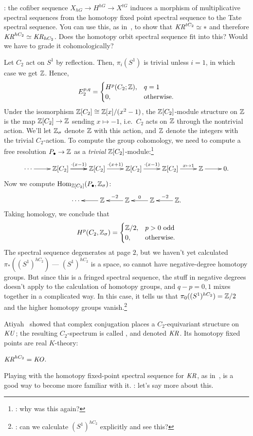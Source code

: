 \TODO: the cofiber sequence $X_{hG}\to H^{hG}\to X^{tG}$ induces a morphism of multiplicative spectral sequences
from the homotopy fixed point spectral sequence to the Tate spectral sequence. You can use this, as
in~\cite[Prop.~11]{HS14}, to show that $\mathit{KR}^{tC_2}\simeq *$ and therefore $\mathit{KR}^{hC_2}\simeq\mathit{KR}_{hC_2}$. Does the
homotopy orbit spectral sequence fit into this? Would we have to grade it cohomologically?
\begin{exm}
\label{reflection}
Let $C_2$ act on $S^1$ by reflection. Then, $\pi_i(S^1)$ is trivial unless $i = 1$, in which case we get $\mathbb Z$.
Hence,
\[E_2^{p,q} = \begin{cases}
	H^p(C_2;\mathbb Z), &q = 1\\
	0, &\text{otherwise}.
\end{cases}\]
Under the isomorphism $\mathbb Z[C_2]\cong \mathbb Z[x]/(x^2-1)$, the $\mathbb Z[C_2]$-module structure on $\mathbb Z$ is the map
$\mathbb Z[C_2]\to\mathbb Z$ sending $x\mapsto -1$, i.e.\ $C_2$ acts on $\mathbb Z$ through the nontrivial action. We'll let $\mathbb Z_\sigma$
denote $\mathbb Z$ with this action, and $\mathbb Z$ denote the integers with the trivial $C_2$-action. To compute the group
cohomology, we need to compute a free resolution $P_\bullet\to\mathbb Z$ as a \emph{trivial}
$\mathbb Z[C_2]$-module:\footnote{\TODO: why was this again?}
\[\xymatrix{
	\dotsb\ar[r] & \Z[C_2]\ar[r]^{\cdot(x-1)}\ar[r] & \Z[C_2]\ar[r]^{\cdot(x+1)} & \Z[C_2]\ar[r]^{\cdot(x-1)} &
	\Z[C_2]\ar[r]^-{x\mapsto 1} & \Z\ar[r] & 0.
}\]
Now we compute $\operatorname{Hom}_{\mathbb Z[C_2]}(P_\bullet, \mathbb Z_\sigma)$:
\[\xymatrix{
	\dotsb & \Z\ar[l] & \Z\ar[l]_{-2} & \Z\ar[l]_0 & \Z.\ar[l]_{-2}
}\]
Taking homology, we conclude that
\[H^p(C_2, \mathbb Z_\sigma) = \begin{cases}
	\mathbb Z/2, &p > 0\text{ odd}\\
	0, &\text{otherwise.}
\end{cases}\]
The spectral sequence degenerates at page $2$, but we haven't yet calculated $\pi_*((S^1)^{hC_2})$ ---
$(S^1)^{hC_2}$ is a space, so cannot have negative-degree homotopy groups. But since this is a fringed spectral
sequence, the stuff in negative degrees doesn't apply to the calculation of homotopy groups, and $q - p = 0,1$
mixes together in a complicated way. In this case, it tells us that $\pi_0((S^1)^{hC_2}) = \mathbb Z/2$ and the higher
homotopy groups vanish.\footnote{\TODO: can we calculate $(S^1)^{hC_2}$ explicitly and see this?}
\end{exm}
\begin{exm}
Atiyah~\cite{AtiyahKR} showed that complex conjugation places a $C_2$-equivariant structure on $\mathit{KU}$; the resulting
$C_2$-spectrum is called , and denoted $\mathit{KR}$. Its homotopy fixed points are real $K$-theory:
\begin{thm}
$\mathit{KR}^{hC_2} = \mathit{KO}$.
\end{thm}
Playing with the homotopy fixed-point spectral sequence for $\mathit{KR}$, as in~\cite{HS14}, is a good way to become more
familiar with it. \TODO: let's say more about this.
\end{exm}
